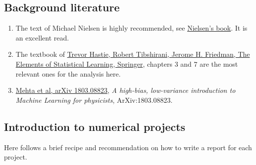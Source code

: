 \documentclass[%
oneside,                 %
final,                   %
10pt]{article}
\begin{document}
\subsection{Background literature}

\begin{enumerate}
\item The text of Michael Nielsen is highly recommended, see \href{{http://neuralnetworksanddeeplearning.com/}}{Nielsen's book}. It is an excellent read.

\item The textbook of \href{{https://www.springer.com/gp/book/9780387848570}}{Trevor Hastie, Robert Tibshirani, Jerome H. Friedman, The Elements of Statistical Learning, Springer}, chapters 3 and 7 are the most relevant ones for the analysis here. 

\item \href{{https://arxiv.org/abs/1803.08823}}{Mehta et al, arXiv 1803.08823}, \emph{A high-bias, low-variance introduction to Machine Learning for physicists}, ArXiv:1803.08823.
\end{enumerate}

\noindent
\subsection{Introduction to numerical projects}

Here follows a brief recipe and recommendation on how to write a report for each
project.
\end{document}
